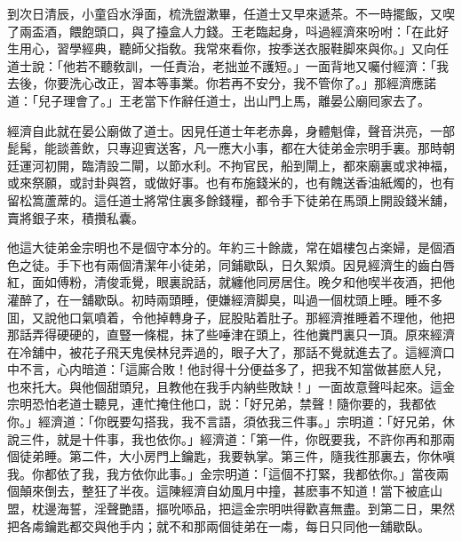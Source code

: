 到次日清辰，小童舀水淨面，梳洗盥漱畢，任道士又早來遞茶。不一時擺飯，又喫了兩盃酒，餵飽頭口，與了擡盒人力錢。王老臨起身，呌過經濟來吩咐：「在此好生用心，習學經典，聽師父指敎。我常來看你，按季送衣服鞋脚來與你。」又向任道士說：「他若不聽敎訓，一任責治，老拙並不護短。」一面背地又囑付經濟：「我去後，你要洗心改正，習本等事業。你若再不安分，我不管你了。」那經濟應諾道：「兒子理會了。」王老當下作辭任道士，出山門上馬，離晏公廟囘家去了。

經濟自此就在晏公廟做了道士。因見任道士年老赤鼻，身體魁偉，聲音洪亮，一部髭髯，能談善飲，只專迎賓送客，凡一應大小事，都在大徒弟金宗明手裏。那時朝廷運河初開，臨清設二閘，以節水利。不拘官民，船到閘上，都來廟裏或求神福，或來祭願，或討卦與笤，或做好事。也有布施錢米的，也有餽送香油紙燭的，也有留松篙蘆蓆的。這任道士將常住裏多餘錢糧，都令手下徒弟在馬頭上開設錢米舖，賣將銀子來，積攢私囊。

他這大徒弟金宗明也不是個守本分的。年約三十餘歲，常在娼樓包占楽婦，是個酒色之徒。手下也有兩個清潔年小徒弟，同鋪歇臥，日久絮煩。因見經濟生的齒白唇紅，面如傅粉，清俊乖覺，眼裏說話，就纏他同房居住。晚夕和他喫半夜酒，把他灌醉了，在一舖歇臥。初時兩頭睡，便嫌經濟脚臭，叫過一個枕頭上睡。睡不多囬，又說他口氣噴着，令他掉轉身子，屁股貼着肚子。那經濟推睡着不理他，他把那話弄得硬硬的，直豎一條棍，抹了些唾津在頭上，徃他糞門裏只一頂。原來經濟在冷舖中，被花子飛天鬼侯林兒弄過的，眼子大了，那話不覺就進去了。這經濟口中不言，心内暗道：「這廝合敗！他討得十分便益多了，把我不知當做甚麽人兒，也來托大。與他個甜頭兒，且教他在我手内納些敗缺！」一面故意聲呌起來。這金宗明恐怕老道士聽見，連忙掩住他口，説：「好兄弟，禁聲！隨你要的，我都依你。」經濟道：「你旣要勾搭我，我不言語，須依我三件事。」宗明道：「好兄弟，休說三件，就是十件事，我也依你。」經濟道：「第一件，你旣要我，不許你再和那兩個徒弟睡。第二件，大小房門上鑰匙，我要執掌。第三件，隨我徃那裏去，你休嗔我。你都依了我，我方依你此事。」金宗明道：「這個不打緊，我都依你。」當夜兩個顛來倒去，整狂了半夜。這陳經濟自幼風月中撞，甚麽事不知道！當下被底山盟，枕邊海誓，淫聲艷語，摳吮㖭品，把這金宗明哄得歡喜無盡。到第二日，果然把各䖏鑰匙都交與他手内；就不和那兩個徒弟在一䖏，每日只同他一舖歇臥。

